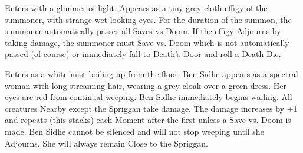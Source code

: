 {
Enters with a glimmer of light. Appears as a tiny grey cloth effigy of the summoner, with strange wet-looking eyes. For the duration of the summon, the summoner automatically passes all Saves vs Doom. If the effigy Adjourns by taking damage, the summoner must Save vs. Doom which is not automatically passed (of course) or immediately fall to Death's Door and roll a Death Die.


Enters as a white mist boiling up from the floor.  Ben Sidhe appears as a spectral woman with long streaming hair, wearing a grey cloak over a green dress.  Her eyes are red from continual weeping.  Ben Sidhe immediately begins wailing.  All creatures Nearby except the Spriggan take \DICE damage.  The damage increases by +1 and repeats (this stacks) each Moment after the first unless a Save vs. Doom is made.  Ben Sidhe cannot be silenced and will not stop weeping until she Adjourns.  She will always remain Close to the Spriggan.










}%

